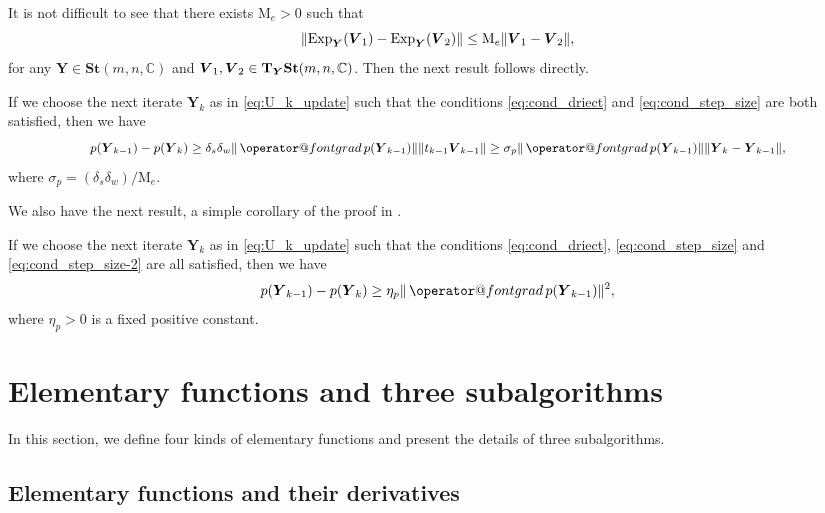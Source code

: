 \documentclass[final,onefignum,onetabnum]{siamart190516}
\makeatletter
\newcommand{\matr}[1]{\boldsymbol{#1}}
\newcommand{\ProjGrad}[2]{\mathop{{\operator@font grad} }#1(#2)}
\newcommand{\CC}{\mathbb{C}}
\newcommand{\St}{\mathbf{St}}
\makeatother
\begin{document}
It is not difficult to see that there exists $\mathrm{M}_{e}>0$ such that
\begin{equation*}
\|{\rm Exp}_{\matr{Y}}(\matr{V}_{1})-{\rm Exp}_{\matr{Y}}(\matr{V}_{2})\|\leq \mathrm{M}_{e}\|\matr{V}_{1}-\matr{V}_{2}\|,
\end{equation*}
for any $\matr{Y}\in \St(m,n,\CC)$ and $\matr{V}_1,\matr{V}_2\in{\rm\bf T}_{\matr{Y}} \St(m,n,\CC)$. 
Then the next result follows directly.
\begin{lemma}\label{lemma:line_search}
If we choose the next iterate $\matr{Y}_k$ as in \cref{eq:U_k_update} such that the conditions \cref{eq:cond_driect} and \cref{eq:cond_step_size} are both satisfied,
then we have 
\begin{align*}{\small 
p(\matr{Y}_{k-1})-p(\matr{Y}_{k})\geq \delta_{s} \delta_{w}\|\ProjGrad{p}{\matr{Y}_{k-1}}\| \|t_{k-1}\matr{V}_{k-1}\|
\geq \sigma_{p}\|\ProjGrad{p}{\matr{Y}_{k-1}}\| \|\matr{Y}_{k}-\matr{Y}_{k-1}\|,}
\end{align*}
where $\sigma_p=(\delta_{s} \delta_{w})/\mathrm{M}_{e}$. 
\end{lemma}

We also have the next result, a simple corollary of the proof in \cite[Theorem 2]{ring2012optimization}.

\begin{lemma}\label{lemma:line_search-2}
If we choose the next iterate $\matr{Y}_k$ as in \cref{eq:U_k_update} such that the conditions \cref{eq:cond_driect},  \cref{eq:cond_step_size} and \cref{eq:cond_step_size-2} are all satisfied, then we have 
\begin{equation}\label{eq:cond_weak_h}
p(\matr{Y}_{k-1})-p(\matr{Y}_{k})\geq \eta_p\|\ProjGrad{p}{\matr{Y}_{k-1}}\|^2, 
\end{equation}
where $\eta_p>0$ is a fixed positive constant. 
\end{lemma}

\section{Elementary functions and three subalgorithms}\label{sec:Jacobi_g_rota}
In this section, we define four kinds of elementary functions and present the details of three subalgorithms. 


\subsection{Elementary functions and their derivatives}\label{subsec:part_deri_elem_func}
\end{document}
